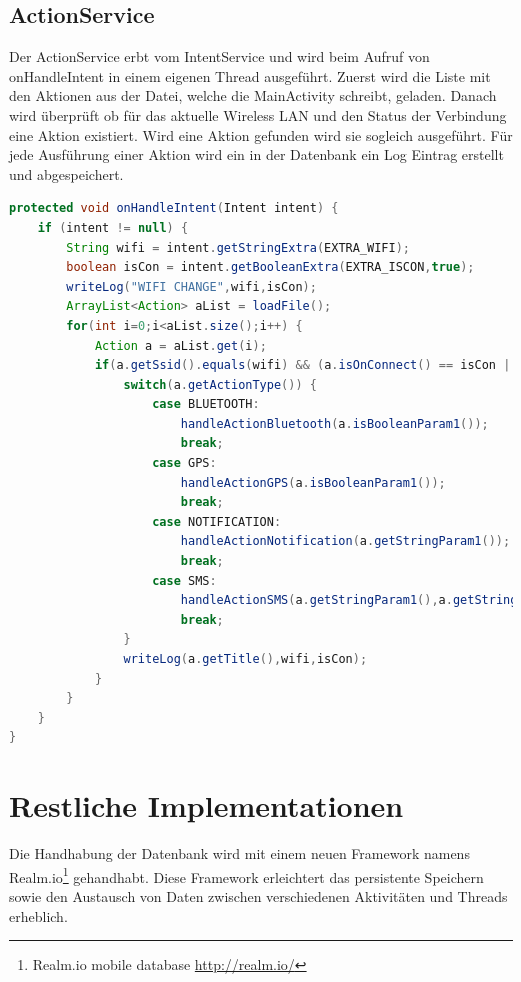 \subsection{ActionService}
Der ActionService erbt vom IntentService und wird beim Aufruf von onHandleIntent in einem eigenen Thread ausgeführt. Zuerst wird die Liste mit den Aktionen aus der Datei, welche die MainActivity schreibt, geladen. Danach wird überprüft ob für das aktuelle Wireless LAN und den Status der Verbindung eine Aktion existiert. Wird eine Aktion gefunden wird sie sogleich ausgeführt. Für jede Ausführung einer Aktion wird ein in der Datenbank ein Log Eintrag erstellt und abgespeichert.
\begin{lstlisting}[language=Java]
protected void onHandleIntent(Intent intent) {
    if (intent != null) {
        String wifi = intent.getStringExtra(EXTRA_WIFI);
        boolean isCon = intent.getBooleanExtra(EXTRA_ISCON,true);
        writeLog("WIFI CHANGE",wifi,isCon);
        ArrayList<Action> aList = loadFile();
        for(int i=0;i<aList.size();i++) {
            Action a = aList.get(i);
            if(a.getSsid().equals(wifi) && (a.isOnConnect() == isCon || a.isOnLeave() != isCon)) {
                switch(a.getActionType()) {
                    case BLUETOOTH:
                        handleActionBluetooth(a.isBooleanParam1());
                        break;
                    case GPS:
                        handleActionGPS(a.isBooleanParam1());
                        break;
                    case NOTIFICATION:
                        handleActionNotification(a.getStringParam1());
                        break;
                    case SMS:
                        handleActionSMS(a.getStringParam1(),a.getStringParam2());
                        break;
                }
                writeLog(a.getTitle(),wifi,isCon);
            }
        }
    }
}
\end{lstlisting}

\section{Restliche Implementationen}
Die Handhabung der Datenbank wird mit einem neuen Framework namens Realm.io\footnote{Realm.io mobile database \url{http://realm.io/}} gehandhabt. Diese Framework erleichtert das persistente Speichern sowie den Austausch von Daten zwischen verschiedenen Aktivitäten und Threads erheblich.